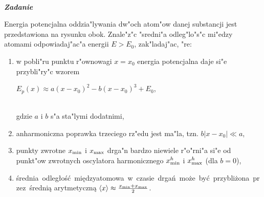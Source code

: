 \documentclass[11pt,a4paper]{article}
\newcounter{zadanie}\newcommand{\zadanie}[1][]{\addtocounter{zadanie}{1} ~\\  {\bf \emph{Zadanie \arabic{zadanie} #1 }} \\}
\begin{document}
\zadanie
\begin{figure}\vspace{-1cm}
\end{figure}
Energia potencjalna oddzia"lywania dw"och atom"ow danej substancji jest
przedstawiona na rysunku obok. Znale"z"c "sredni"a
odleg"lo"s"c mi"edzy atomami odpowiadaj"ac"a energii $E>E_0$,
zak"ladaj"ac, "re:
\begin{enumerate}
\item 
\parbox[t]{\linewidth}{
w pobli"ru punktu r"ownowagi $x=x_0$ energia 
potencjalna daje si"e przybli"ry"c wzorem\\[2mm] 
\centerline{$E_p(x) \approx a (x-x_0)^2 - b (x-x_0)^3 + E_0$,}\\[2mm]
gdzie $a$ i $b$ s"a sta"lymi dodatnimi,
}
\item anharmoniczna poprawka trzeciego rz"edu jest ma"la, tzn. \mbox{$b |x-x_0|\ll a$},
\item punkty zwrotne $x_{\rm min}$ i $x_{\rm max}$
drga"n bardzo niewiele r"o"rni"a si"e od punkt"ow zwrotnych
oscylatora harmonicznego $x^h_{\rm min}$ i $x^h_{\rm max}$ (dla $b=0$),
\item \mbox{średnia odległość międzyatomowa w czasie drgań może być
przybliżona przez średnią} arytmetyczną $\langle x\rangle \approx \frac{x_{\rm min}+x_{\rm max}}{2}$.
\end{enumerate}
\vskip 10pt
\end{document}
